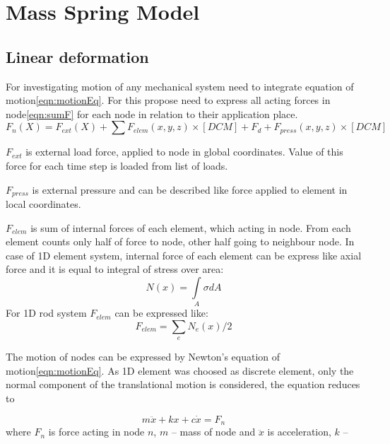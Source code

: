 \section*{Mass Spring Model}
\subsection*{Linear deformation}
For investigating motion of any mechanical system need to integrate equation of
motion\eqref{eqn:motionEq}. For this propose need to express all acting forces in
node\eqref{eqn:sumF} for each node in relation to their application place. 
\begin{equation}\label{eqn:sumF}
   F_n(X)= F_{ext}(X) + \sum{F_{elem}(x, y, z)\times[DCM]} + F_{d} + F_{press}(x, y, z)\times[DCM]
\end{equation}\par
$F_{ext}$ is external load force, applied to node in global coordinates. Value of this force for
each time step is loaded from list of loads.\par $F_{press}$ is external pressure and can be
described like force applied to element in local coordinates.\par $F_{elem}$ is sum of internal
forces of each element, which acting in node. From each element counts only half of force to node,
other half going to neighbour node. In case of 1D element system, internal force of each element can
be express like axial force and it is equal to integral of stress over area:
\begin{equation}\label{eqn:Nx}
  N(x)= \int\limits_A \sigma dA
\end{equation}
For 1D rod system $F_{elem}$ can be expressed like:
\begin{equation}\label{eqn:Felem}
  F_{elem} = \sum_{e}N_e(x)/2
\end{equation}\par
The motion of nodes can be expressed by Newton's equation of motion\ref{eqn:motionEq}. As 1D
element was choosed as discrete element, only the normal component of the
translational motion is considered, the equation reduces to\par
\begin{equation}\label{eqn:motionEq}
  m\ddot{x} + kx + c\dot{x} = F_n
\end{equation}
where $F_n$ is force acting in node $n$, $m$ – mass of node and $\ddot{x}$ is acceleration, $k$ –
